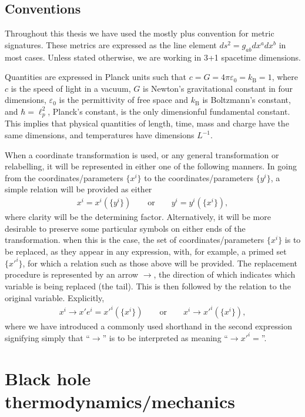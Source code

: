 \documentclass[
twoside,
openright,
frontopenright,
]{dmathesis}
\begin{document}
\section*{Conventions}
 Throughout this thesis we have used
the mostly plus convention for metric signatures. These metrics are expressed as
the line element $ds^2 = g_{ab}dx^adx^b$ in most cases. Unless stated otherwise,
we are working in 3+1 spacetime dimensions.

Quantities are expressed in Planck units such that
$c = G = 4\pi\varepsilon_0 = k_\mathrm{B} = 1$, where $c$ is the speed of light
in a vacuum, $G$ is Newton's gravitational constant in four dimensions,
$\varepsilon_0$ is the permittivity of free space and $k_\mathrm{B}$ is
Boltzmann's constant, and $\hbar = \ell_p^2$, Planck's constant, is the only
dimensionful fundamental constant. This implies that physical quantities of
length, time, mass and charge have the same dimensions, and temperatures have
dimensions $L^{-1}$.

When a coordinate transformation is used, or any general transformation or
relabelling, it will be represented in either one of the following manners. In
going from the coordinates/parameters $\{x^i\}$ to the coordinates/parameters
$\{y^i\}$, a simple relation will be provided as either
\begin{align*}
  x^i = x^i(\{y^i\})\qquad \mbox{or} \qquad y^i = y^i(\{x^i\}),
\end{align*}
where clarity will be the determining factor. Alternatively, it will be more
desirable to preserve some particular symbols on either ends of the
transformation. when this is the case, the set of coordinates/parameters
$\{x^i\}$ is to be replaced, as they appear in any expression, with, for
example, a primed set $\{x'^i\}$, for which a relation such as those above will
be provided. The replacement procedure is represented by an arrow $\to$, the
direction of which indicates which variable is being replaced (the tail). This
is then followed by the relation to the original variable. Explicitly,
\begin{align*}
  x^i \to x'e^i=x'^i(\{x^i\}) \qquad \mbox{or} \qquad x^i \to x'^i(\{x^i\}),
\end{align*}
where we have introduced a commonly used shorthand in the second expression
signifying simply that ``$\to$'' is to be interpreted as meaning
``$\to x'^i =$''.

\chapter{Black hole thermodynamics/mechanics}
\label{cha:BHTD}
\end{document}
